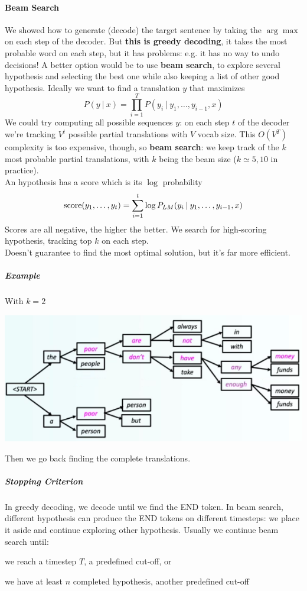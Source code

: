 \documentclass[10pt]{report}
\begin{document}
\paragraph{Beam Search} We showed how to generate (decode) the target sentence by taking the $\arg\max$ on each step of the decoder. But \textbf{this is greedy decoding}, it takes the most probable word on each step, but it has problems: e.g. it has no way to undo decisions! A better option would be to use \textbf{beam search}, to explore several hypothesis and selecting the best one while also keeping a list of other good hypothesis. Ideally we want to find a translation $y$ that maximizes $$P(y\:|\:x) = \prod_{i=1}^T P(y_i\:|\:y_1,\ldots,y_{i-1},x)$$
We could try computing all possible sequences $y$: on each step $t$ of the decoder we're tracking $V^t$ possible partial translations with $V$ vocab size. This $O(V^T)$ complexity is too expensive, though, so \textbf{beam search}: we keep track of the $k$ most probable partial translations, with $k$ being the beam size ($k\simeq 5, 10$ in practice).\\
An hypothesis has a score which is its $\log$ probability $$\hbox{score}(y_1,\ldots,y_t) = \sum_{i=1}^t \log P_{LM}(y_i\:|\:y_1,\ldots,y_{i-1},x)$$
Scores are all negative, the higher the better. We search for high-scoring hypothesis, tracking top $k$ on each step.\\
Doesn't guarantee to find the most optimal solution, but it's far more efficient.
\subparagraph{Example} With $k=2$
\begin{center}
	\includegraphics[scale=0.6]{65.png}
\end{center}
Then we go back finding the complete translations.
\subparagraph{Stopping Criterion} In greedy decoding, we decode until we find the END token. In beam search, different hypothesis can produce the END tokens on different timesteps: we place it aside and continue exploring other hypothesis. Usually we continue beam search until:\begin{list}{}{}
	\item we reach a timestep $T$, a predefined cut-off, or
	\item we have at least $n$ completed hypothesis, another predefined cut-off
\end{list}
\end{document}
